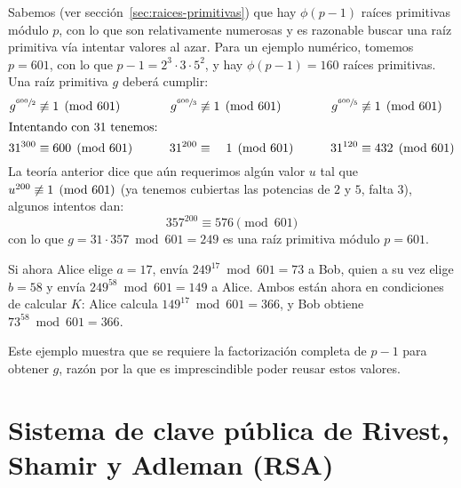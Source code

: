   Sabemos
  (ver sección~\ref{sec:raices-primitivas})%
  que hay \(\phi(p - 1)\) raíces primitivas módulo \(p\),
  con lo que son relativamente numerosas
  y es razonable buscar una raíz primitiva
  vía intentar valores al azar.
  Para un ejemplo numérico,
  tomemos \(p = 601\),
  con lo que \(p - 1 = 2^3 \cdot 3 \cdot 5^2\),
  y hay \(\phi(p - 1) = 160\) raíces primitivas.
  Una raíz primitiva \(g\) deberá cumplir:
  \begin{alignat*}{3}
    g^{\sfrac{600}{2}}
      &\centernot\equiv 1 \pmod{601}
    &
    g^{\sfrac{600}{3}}
      &\centernot\equiv 1 \pmod{601}
    &
    g^{\sfrac{600}{5}}
      &\centernot\equiv 1 \pmod{601} \\
  \intertext{Intentando con 31 tenemos:}
    31^{300}
      &\equiv 600 \pmod{601}
    \qquad&
    31^{200}
      &\equiv \phantom{00}1 \pmod{601}
    \qquad&
    31^{120}
      &\equiv 432 \pmod{601}
  \end{alignat*}
  La teoría anterior dice que aún requerimos algún valor \(u\)
  tal que \(u^{200} \centernot\equiv 1 \pmod{601}\)
  (ya tenemos cubiertas las potencias de \(2\) y \(5\),
   falta \(3\)),
  algunos intentos dan:
  \begin{equation*}
    357^{200}
      \equiv 576 \pmod{601}
  \end{equation*}
  con lo que \(g = 31 \cdot 357 \bmod 601 = 249\)
  es una raíz primitiva módulo \(p = 601\).

  Si ahora \foreignlanguage{english}{Alice} elige \(a = 17\),
  envía \(249^{17} \bmod 601 = 73\)
  a \foreignlanguage{english}{Bob},
  quien a su vez elige \(b = 58\)
  y envía \(249^{58} \bmod 601 = 149\)
  a \foreignlanguage{english}{Alice}.
  Ambos están ahora en condiciones de calcular \(K\):
  \foreignlanguage{english}{Alice}
  calcula \(149^{17} \bmod 601 = 366\),
  y \foreignlanguage{english}{Bob}
  obtiene \(73^{58} \bmod 601 = 366\).

  Este ejemplo muestra
  que se requiere la factorización completa de \(p - 1\)
  para obtener \(g\),
  razón por la que es imprescindible poder reusar estos valores.

\section{Sistema de clave pública de Rivest,
       Shamir y Adleman (RSA)}
\label{sec:RSA}

